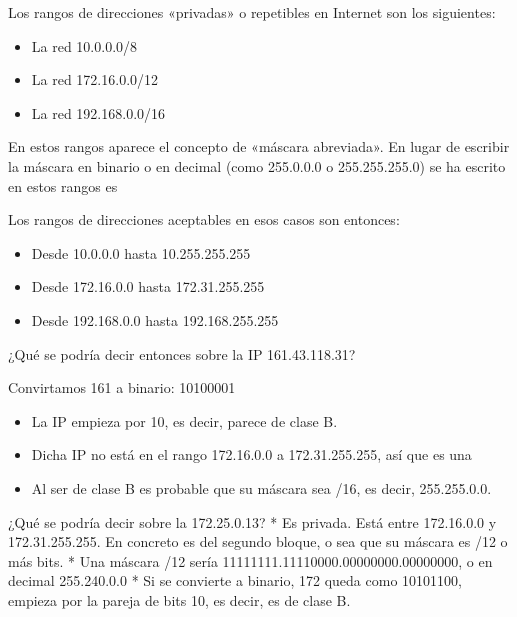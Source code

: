 \documentclass[letterpaper,10pt,spanish]{sphinxmanual}
\begin{document}
\sphinxAtStartPar
Los rangos de direcciones «privadas» o repetibles en Internet son los siguientes:
\begin{itemize}
\item {} 
\sphinxAtStartPar
La red 10.0.0.0/8

\item {} 
\sphinxAtStartPar
La red 172.16.0.0/12

\item {} 
\sphinxAtStartPar
La red 192.168.0.0/16

\end{itemize}

\sphinxAtStartPar
En estos rangos aparece el concepto de «máscara abreviada». En lugar de escribir la máscara en binario o en decimal (como 255.0.0.0 o 255.255.255.0) se ha escrito en estos rangos es 

\sphinxAtStartPar
Los rangos de direcciones aceptables en esos casos son entonces:
\begin{itemize}
\item {} 
\sphinxAtStartPar
Desde 10.0.0.0 hasta 10.255.255.255

\item {} 
\sphinxAtStartPar
Desde 172.16.0.0 hasta 172.31.255.255

\item {} 
\sphinxAtStartPar
Desde 192.168.0.0 hasta 192.168.255.255

\end{itemize}

\sphinxAtStartPar
¿Qué se podría decir entonces sobre la IP 161.43.118.31?

\sphinxAtStartPar
Convirtamos 161 a binario: 10100001
\begin{itemize}
\item {} 
\sphinxAtStartPar
La IP empieza por 10, es decir, parece de clase B.

\item {} 
\sphinxAtStartPar
Dicha IP no está en el rango 172.16.0.0 a 172.31.255.255, así que es una 

\item {} 
\sphinxAtStartPar
Al ser de clase B es probable que su máscara sea /16, es decir, 255.255.0.0.

\end{itemize}

\sphinxAtStartPar
¿Qué se podría decir sobre la 172.25.0.13?
* Es privada. Está entre 172.16.0.0 y 172.31.255.255. En concreto es del segundo bloque, o sea que su máscara es /12 o más bits.
* Una máscara /12 sería 11111111.11110000.00000000.00000000, o en decimal 255.240.0.0
* Si se convierte a binario, 172 queda como 10101100, empieza por la pareja de bits 10, es decir, es de clase B.
\end{document}
